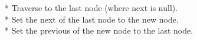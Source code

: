 \documentclass[preview]{standalone}
\begin{document}
*   Traverse to the last node (where next is null).\\*   Set the next of the last node to the new node.\\*   Set the previous of the new node to the last node.\\
\end{document}
